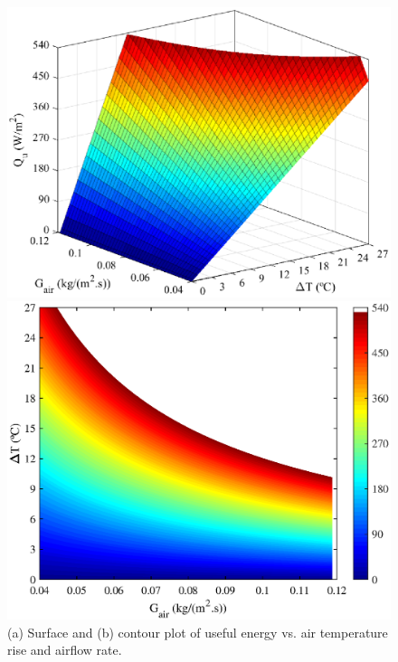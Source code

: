 \begin{figure}[ht!]
	\begin{minipage}{0.49\columnwidth}
		\includegraphics[scale=0.48]{figs/QU_Tout_Gair.eps}
	\end{minipage}
	\begin{minipage}{0.49\columnwidth}
		\includegraphics[scale=0.48]{figs/contour_Q.eps}
	\end{minipage}
	\caption{(a) Surface and (b) contour plot of useful energy vs. air temperature rise and airflow rate.}
	\label{QU-Tout-Gair}
\end{figure}

